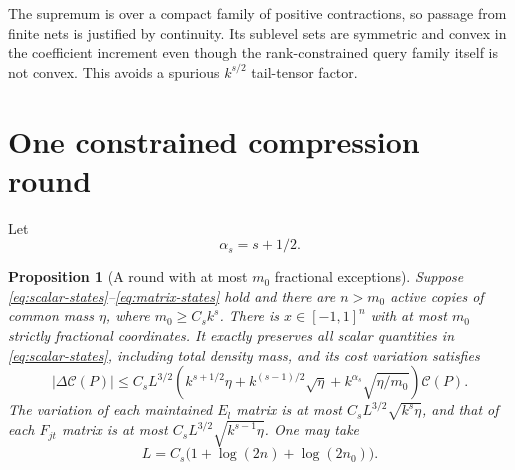 \documentclass[11pt]{article}
\newtheorem{proposition}[theorem]{Proposition}
\theoremstyle{remark}\newtheorem{remark}[theorem]{Remark}
\newcommand{\cost}{\mathcal C}\newcommand{\OPT}{\mathsf{OPT}}
\begin{document}
The supremum is over a compact family of positive contractions, so passage from finite nets is justified by continuity. Its sublevel sets are symmetric and convex in the coefficient increment even though the rank-constrained query family itself is not convex. This avoids a spurious $k^{s/2}$ tail-tensor factor.

\section{One constrained compression round}\label{sec:round}
Let
\[
 \alpha_s=s+1/2.
\]
\begin{proposition}[A round with at most $m_0$ fractional exceptions]\label{prop:round}
Suppose \eqref{eq:scalar-states}--\eqref{eq:matrix-states} hold and there are $n>m_0$ active copies of common mass $\eta$, where $m_0\ge C_s k^s$. There is $x\in[-1,1]^n$ with at most $m_0$ strictly fractional coordinates. It exactly preserves all scalar quantities in \eqref{eq:scalar-states}, including total density mass, and its cost variation satisfies
\begin{equation}\label{eq:one-round}
 |\Delta\cost(P)|\le C_s L^{3/2}
 \left(k^{s+1/2}\eta+k^{(s-1)/2}\sqrt\eta+
 k^{\alpha_s}\sqrt{\eta/m_0}\right)\cost(P).
\end{equation}
The variation of each maintained $E_l$ matrix is at most $C_sL^{3/2}\sqrt{k^s\eta}$, and that of each $F_{jt}$ matrix is at most $C_sL^{3/2}\sqrt{k^{s-1}\eta}$. One may take
\[
 L=C_s\bigl(1+\log(2n)+\log(2n_0)\bigr).
\]
\end{proposition}
\end{document}
